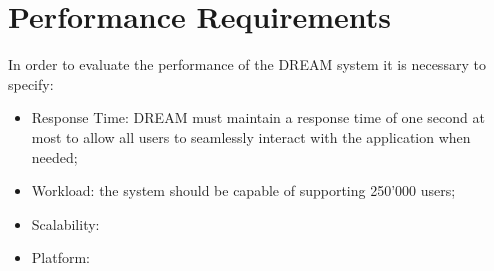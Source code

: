 \section{Performance Requirements}

In order to evaluate the performance of the DREAM system it is necessary to specify:
\begin{itemize}
    \item Response Time: DREAM must maintain a response time of one second at most to allow all users to seamlessly interact with the application when needed;
    \item Workload: the system should be capable of supporting 250'000 users;
    \item Scalability:
    \item Platform: 
\end{itemize}
